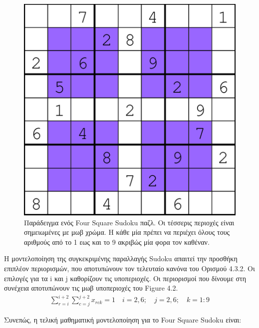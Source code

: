 \documentclass[oneside,12pt]{book}
\theoremstyle{definition}
\begin{document}
\begin{figure}[h]
	\centering
	\includegraphics[scale=0.7]{Figures/An-example-Four-Square-Sudoku-puzzle.png}
	\caption{Παράδειγμα ενός Four Square Sudoku παζλ. Οι τέσσερις περιοχές είναι σημειωμένες με μωβ χρώμα. Η κάθε μία πρέπει να περιέχει όλους τους αριθμούς από το 1 εως και το 9 ακριβώς μία φορα τον καθέναν.}
\end{figure}

Η μοντελοποίηση της συγκεκριμένης παραλλαγής Sudoku απαιτεί την προσθήκη επιπλέον περιορισμών, που αποτυπώνουν τον τελευταίο κανόνα του Ορισμού 4.3.2. Οι επιλογές για τα i και j καθορίζουν τις υποπεριοχές. Οι περιορισμοί που δίνουμε στη συνέχεια αποτυπώνουν τις μωβ υποπεριοχές του Figure 4.2.\\

\begin{align*}
	\sum_{r=i}^{i+2}{\sum_{c=j}^{j+2}x_{rck}} = 1 \quad i=2,6; \quad j=2,6; \quad k=1:9
\end{align*}

Συνεπώς, η τελική μαθηματική μοντελοποίηση για το Four Square Sudoku είναι:
\end{document}
